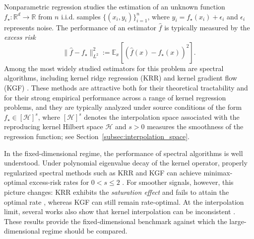 \documentclass{article}
\theoremstyle{plain}
\theoremstyle{definition}
\theoremstyle{remark}
\begin{document}
Nonparametric regression studies the estimation of an unknown function $f_{\star}:\mathbb{R}^d\to\mathbb{R}$ from $n$ i.i.d. samples $\{(x_i,y_i)\}_{i=1}^n$, where $y_i = f_{\star}(x_i) + \epsilon_i$ and $\epsilon_i$ represents noise. 
The performance of an estimator $\hat{f}$ is typically measured by the \textit{excess risk} 
\[
\|\hat f-f_{\star}\|_{L^2}^2:=\mathbb{E}_x[(\hat f(x)-f_{\star}(x))^2].
\]
Among the most widely studied estimators for this problem are spectral algorithms, including kernel ridge regression (KRR) and kernel gradient flow (KGF) \citep{Caponnetto2006OptimalRF,caponnetto2007optimal}. 
These methods are attractive both for their theoretical tractability and for their strong empirical performance across a range of kernel regression problems, and they are typically analyzed under source conditions of the form $f_{\star}\in[\mathcal H]^s$, where $[\mathcal H]^s$ denotes the interpolation space associated with the reproducing kernel Hilbert space $\mathcal H$ and $s>0$ measures the smoothness of the regression function; see Section~\ref{subsec:interpolation_space}. 

In the fixed-dimensional regime, the performance of spectral algorithms is well understood. Under polynomial eigenvalue decay of the kernel operator, properly regularized spectral methods such as KRR and KGF can achieve minimax-optimal excess-risk rates for $0<s\leq 2$ \citep{Caponnetto2006OptimalRF, caponnetto2007optimal, raskutti2014early, Yao2007OnES, Lin_Optimal_2020, zhang2023optimality}. 
For smoother signals, however, this picture changes: KRR exhibits the \emph{saturation effect} and fails to attain the optimal rate \citep{bauer2007_RegularizationAlgorithms, Gerfo_spectral_2008, dicker2017kernel, li2022saturation}, whereas KGF can still remain rate-optimal. At the interpolation limit, several works also show that kernel interpolation can be inconsistent \citep{pmlr-v99-rakhlin19a,beaglehole2022kernel,buchholz2022_KernelInterpolation,li2023kernel}. 
These results provide the fixed-dimensional benchmark against which the large-dimensional regime should be compared. 
\end{document}
